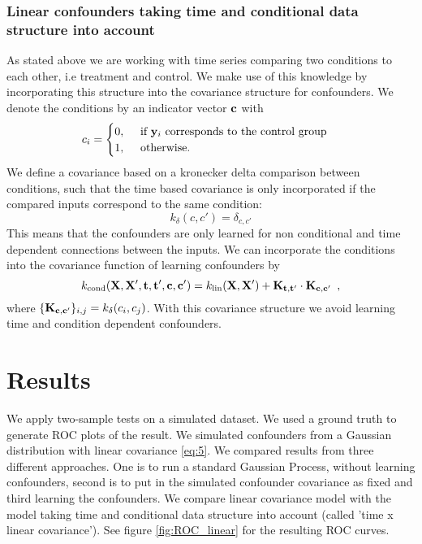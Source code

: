 \documentclass[11pt,a4paper,titlepage,twoside,tablecaptionabove]{article}
\begin{document}
\subsubsection{Linear confounders taking time and conditional data structure into account}
\label{sec:line-conf-taking}

As stated above we are working with time series comparing two
conditions to each other, i.e treatment and control. We make use of
this knowledge by incorporating this structure into the covariance structure for 
confounders. We denote the conditions by an indicator vector $\bf c$ with
\begin{equation}
  \label{eq:8}
  c_i =
  \begin{cases}
    0,\quad\text{ if }{\bf y}_i \text{ corresponds to the control group}\\
    1,\quad\text{ otherwise.}
  \end{cases}
\end{equation}
We define a covariance based on a kronecker delta comparison between
conditions, such that the time based covariance is only incorporated
if the compared inputs correspond to the same condition:
\begin{equation}
  \label{eq:10}
  k_\delta(c,c') = \delta_{c,c'}
\end{equation}
This means that the confounders are only learned for non conditional
and time dependent connections between the inputs.
We can incorporate the conditions into the covariance
function of learning confounders by
\begin{equation}
  \label{eq:9}
  k_\text{cond}({\bf X,X',t,t',c,c'}) = k_\text{lin}({\bf
    X,X'}) + {\bf K_{\bf t,t'}} \cdot {\bf K_{\bf c,c'}}\enspace,
\end{equation}
where $\{ {\bf K_{c,c'}} \}_{i,j}=k_\delta(c_i,c_j)$.
With this covariance structure we avoid learning time and condition
dependent confounders.

\section{Results}
\label{sec:results}

We apply two-sample tests on a simulated dataset. We used a ground
truth to generate ROC plots of the result. We simulated confounders from a
Gaussian distribution with linear covariance \eqref{eq:5}. We compared
results from three different approaches. One is to run a standard
Gaussian Process, without learning confounders, second is to
put in the simulated confounder covariance as fixed and third learning
the confounders. We compare linear covariance model with the model
taking time and conditional data structure into account (called 'time
x linear covariance'). See figure \ref{fig:ROC_linear} for the
resulting ROC curves. 
\end{document}
